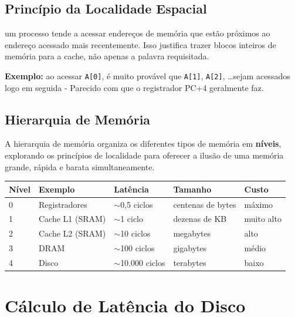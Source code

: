 \documentclass[12pt, a4paper]{article}
\begin{document}
\subsection{Princípio da Localidade Espacial}

um processo tende a acessar endereços de memória que estão próximos ao endereço acessado mais recentemente. Isso justifica trazer blocos inteiros de memória para a cache, não apenas a palavra requisitada.


\begin{caixaverde}
  \textbf{Exemplo:} ao acessar \texttt{A[0]}, é muito provável que
  \texttt{A[1]}, \texttt{A[2]}, \ldots sejam acessados logo em seguida - Parecido com que o registrador PC+4 geralmente faz.
\end{caixaverde}

\subsection{Hierarquia de Memória}

A hierarquia de memória organiza os diferentes tipos de memória em \textbf{níveis},
explorando os princípios de localidade para oferecer a ilusão de uma memória grande,
rápida e barata simultaneamente.

\vspace{4pt}
\begin{tabular}{lllll}
  \toprule
  \textbf{Nível} & \textbf{Exemplo} & \textbf{Latência} & \textbf{Tamanho} & \textbf{Custo}\\
  \midrule
  0 & Registradores   & $\sim$0,5 ciclos  & centenas de bytes & máximo \\
  1 & Cache L1 (SRAM) & $\sim$1 ciclo     & dezenas de KB     & muito alto \\
  2 & Cache L2 (SRAM) & $\sim$10 ciclos   & megabytes         & alto \\
  3 & DRAM            & $\sim$100 ciclos  & gigabytes         & médio \\
  4 & Disco           & $\sim$10.000 ciclos & terabytes       & baixo \\
  \bottomrule
\end{tabular}

\section{Cálculo de Latência do Disco}
\end{document}
